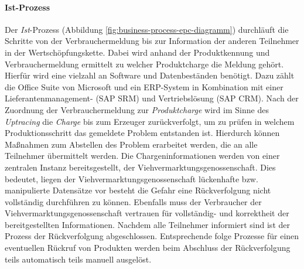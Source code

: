 \paragraph{Ist-Prozess}
Der \textit{Ist}-Prozess (Abbildung \ref{fig:business-process-epc-diagramm}) durchläuft die Schritte von der Verbrauchermeldung bis zur Information der anderen Teilnehmer in der Wertschöpfungskette. Dabei wird anhand der Produktkennung und Verbrauchermeldung ermittelt zu welcher Produktcharge die Meldung gehört. Hierfür wird eine vielzahl an Software und Datenbeständen benötigt. Dazu zählt die Office Suite von Microsoft und ein ERP-System in Kombination mit einer Lieferantenmanagement- (SAP SRM) und Vertriebslösung (SAP CRM). Nach der Zuordnung der Verbrauchermeldung zur \textit{Produktcharge} wird im Sinne des \textit{Uptracing} die \textit{Charge} bis zum Erzeuger zurückverfolgt, um zu prüfen in welchem Produktionsschritt das gemeldete Problem entstanden ist. Hierdurch können Maßnahmen zum Abstellen des Problem erarbeitet werden, die an alle Teilnehmer übermittelt werden. Die Chargeninformationen werden von einer zentralen Instanz bereitsgestellt, der Viehvermarktungsgenossenschaft. Dies bedeutet, liegen der Viehvermarktungsgenossenschaft lückenhafte bzw. manipulierte Datensätze vor besteht die Gefahr eine Rückverfolgung nicht vollständig durchführen zu können. Ebenfalls muss der Verbraucher der Viehvermarktungsgenossenschaft vertrauen für vollständig- und korrektheit der bereitgestellten Informationen. Nachdem alle Teilnehmer informiert sind ist der Prozess der Rückverfolgung abgeschlossen. Entsprechende folge Prozesse für einen eventuellen Rückruf von Produkten werden beim Abschluss der Rückverfolgung teils automatisch teils manuell ausgelöst.

